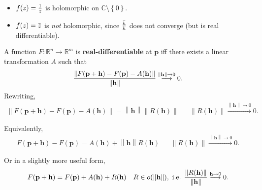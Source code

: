 \begin{example}

\envlist

\begin{itemize}
\tightlist
\item
  \(f(z) = {1\over z}\) is holomorphic on
  \({\mathbb{C}}\setminus\left\{{0}\right\}\).
\item
  \(f(z) = \mkern 1.5mu\overline{\mkern-1.5muz\mkern-1.5mu}\mkern 1.5mu\)
  is \emph{not} holomorphic, since
  \(\mkern 1.5mu\overline{\mkern-1.5muh\mkern-1.5mu}\mkern 1.5mu \over h\)
  does not converge (but is real differentiable).
\end{itemize}

\end{example}

\begin{definition}

A function \(F: {\mathbb{R}}^n\to {\mathbb{R}}^m\) is
\textbf{real-differentiable} at \(\mathbf{p}\) iff there exists a linear
transformation \(A\) such that
\begin{align*}
{ {\left\lVert { F(\mathbf{p} + \mathbf{h}) - F(\mathbf{p}) - A(\mathbf{h}) } \right\rVert} \over {\left\lVert { \mathbf{h} } \right\rVert} } \overset{{\left\lVert {\mathbf{h}} \right\rVert}\to 0}\longrightarrow 0
.\end{align*}
Rewriting,
\begin{align*}
{\left\lVert { F(\mathbf{p} + \mathbf{h}) - F(\mathbf{p})  - A(\mathbf{h}) } \right\rVert} = {\left\lVert { \mathbf{h} } \right\rVert} {\left\lVert { R(\mathbf{h}) } \right\rVert}
&& {\left\lVert {R(\mathbf{h}) } \right\rVert}\overset{{\left\lVert {\mathbf{h} } \right\rVert} \to 0}\longrightarrow 0
.\end{align*}

Equivalently,
\begin{align*}
F(\mathbf{p} + \mathbf{h}) - F(\mathbf{p}) = A(\mathbf{h}) + {\left\lVert {\mathbf{h}} \right\rVert} R(\mathbf{h}) && {\left\lVert {R(\mathbf{h}) } \right\rVert}\overset{{\left\lVert {\mathbf{h} } \right\rVert} \to 0}\longrightarrow 0
.\end{align*}

Or in a slightly more useful form,
\begin{align*}
F(\mathbf{p} + \mathbf{h}) = F(\mathbf{p}) + A(\mathbf{h}) + R(\mathbf{h}) && R\in o( {\left\lVert {\mathbf{h}} \right\rVert}), \text{ i.e. }
{ {\left\lVert { R(\mathbf{h}) } \right\rVert} \over  {\left\lVert {\mathbf{h}} \right\rVert}} \overset{\mathbf{h}\to 0}\longrightarrow 0
.\end{align*}

\end{definition}

